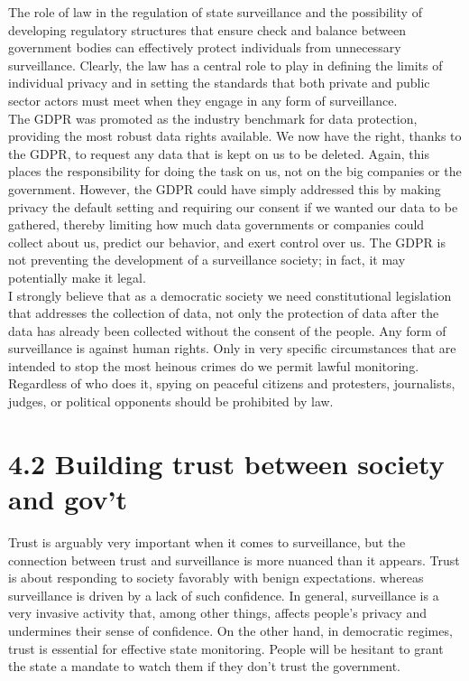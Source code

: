 \documentclass[11pt]{report}
\begin{document}
The role of law in the regulation of state surveillance and the possibility of developing regulatory structures that ensure check and balance between government bodies can effectively protect individuals from unnecessary surveillance. Clearly, the law has a central role to play in defining the limits of individual privacy  and in setting the standards that both private and public sector actors must meet when they engage in any form of surveillance.\\

The GDPR was promoted as the industry benchmark for data protection, providing the most robust data rights available. We now have the right, thanks to the GDPR, to request any data that is kept on us to be deleted. Again, this places the responsibility for doing the task on us, not on the big companies or the government. However, the GDPR could have simply addressed this by making privacy the default setting and requiring our consent if we wanted our data to be gathered, thereby limiting how much data governments or companies could collect about us, predict our behavior, and exert control over us. The GDPR is not preventing the development of a surveillance society; in fact, it may potentially make it legal.\\

I strongly believe that as a democratic society we need constitutional legislation that addresses the collection of data, not only the protection of data after the data has already been collected without the consent of the people. Any form of surveillance is against human rights. Only in very specific circumstances that are intended to stop the most heinous crimes do we permit lawful monitoring. Regardless of who does it, spying on peaceful citizens and protesters, journalists, judges, or political opponents should be prohibited by law.

\section*{4.2 Building trust between society and gov't}

Trust is arguably very important when it comes to surveillance, but the connection between trust and surveillance is more nuanced than it appears. Trust is about responding to society favorably with benign expectations. whereas surveillance is driven by a lack of such confidence. In general, surveillance is a very invasive activity that, among other things, affects people's privacy and undermines their sense of confidence. On the other hand, in democratic regimes, trust is essential for effective state monitoring. People will be hesitant to grant the state a mandate to watch them if they don't trust the government.\\
\end{document}
